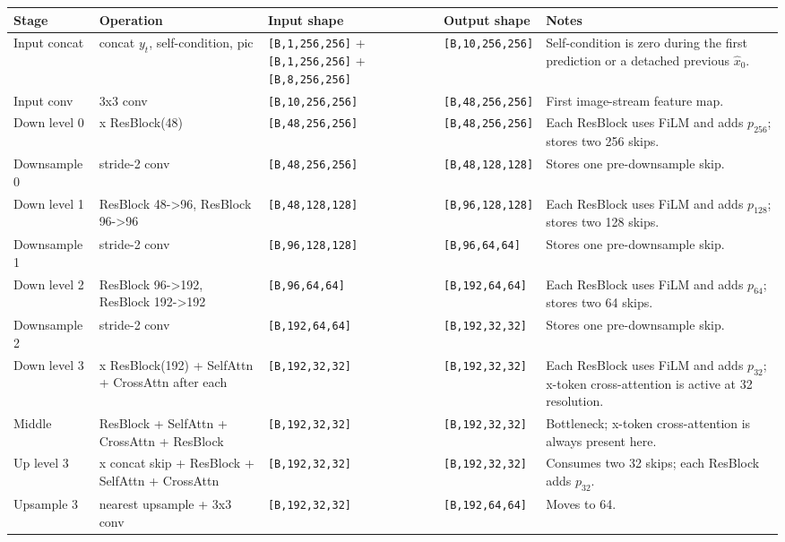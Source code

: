 \documentclass[10pt,landscape]{article}
\newcommand{\shape}[1]{\texttt{[#1]}}
\begin{document}
\small
\begin{tabular}{>{\raggedright\arraybackslash}p{31mm} >{\raggedright\arraybackslash}p{44mm} >{\raggedright\arraybackslash}p{43mm} >{\raggedright\arraybackslash}p{42mm} >{\raggedright\arraybackslash}p{245mm}}
\toprule
Stage & Operation & Input shape & Output shape & Notes \\
\midrule
Input concat & concat $y_t$, self-condition, pic & \shape{B,1,256,256} + \shape{B,1,256,256} + \shape{B,8,256,256} & \shape{B,10,256,256} & Self-condition is zero during the first prediction or a detached previous $\hat{x}_0$. \\
Input conv & 3x3 conv & \shape{B,10,256,256} & \shape{B,48,256,256} & First image-stream feature map. \\
Down level 0 & 2 x ResBlock(48) & \shape{B,48,256,256} & \shape{B,48,256,256} & Each ResBlock uses FiLM and adds $p_{256}$; stores two 256 skips. \\
Downsample 0 & stride-2 conv & \shape{B,48,256,256} & \shape{B,48,128,128} & Stores one pre-downsample skip. \\
Down level 1 & ResBlock 48->96, ResBlock 96->96 & \shape{B,48,128,128} & \shape{B,96,128,128} & Each ResBlock uses FiLM and adds $p_{128}$; stores two 128 skips. \\
Downsample 1 & stride-2 conv & \shape{B,96,128,128} & \shape{B,96,64,64} & Stores one pre-downsample skip. \\
Down level 2 & ResBlock 96->192, ResBlock 192->192 & \shape{B,96,64,64} & \shape{B,192,64,64} & Each ResBlock uses FiLM and adds $p_{64}$; stores two 64 skips. \\
Downsample 2 & stride-2 conv & \shape{B,192,64,64} & \shape{B,192,32,32} & Stores one pre-downsample skip. \\
Down level 3 & 2 x ResBlock(192) + SelfAttn + CrossAttn after each & \shape{B,192,32,32} & \shape{B,192,32,32} & Each ResBlock uses FiLM and adds $p_{32}$; x-token cross-attention is active at 32 resolution. \\
Middle & ResBlock + SelfAttn + CrossAttn + ResBlock & \shape{B,192,32,32} & \shape{B,192,32,32} & Bottleneck; x-token cross-attention is always present here. \\
Up level 3 & 2 x concat skip + ResBlock + SelfAttn + CrossAttn & \shape{B,192,32,32} & \shape{B,192,32,32} & Consumes two 32 skips; each ResBlock adds $p_{32}$. \\
Upsample 3 & nearest upsample + 3x3 conv & \shape{B,192,32,32} & \shape{B,192,64,64} & Moves to 64. \\

\end{tabular}
\end{document}
